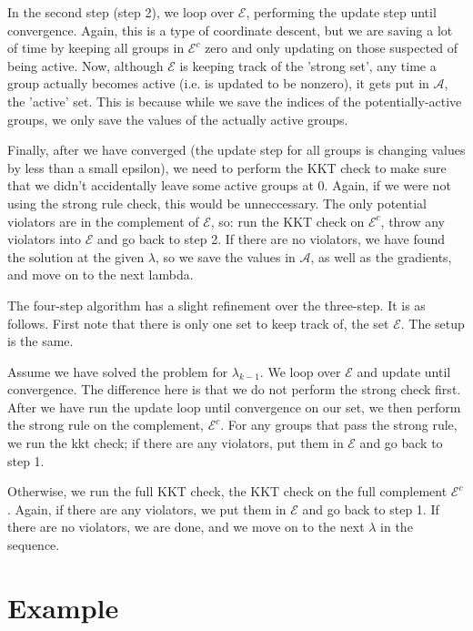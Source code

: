 \documentclass[titlepage]{article}
\begin{document}
In the second step (step 2), we loop over $\mathcal{E}$, performing the update step until convergence. Again, this is a type of coordinate descent, but we are saving a lot of time by keeping all groups in $\mathcal{E}^c$ zero and only updating on those suspected of being active. Now, although $\mathcal{E}$ is keeping track of the 'strong set', any time a group actually becomes active (i.e. is updated to be nonzero), it gets put in $\mathcal{A}$, the 'active' set. This is because while we save the indices of the potentially-active groups, we only save the values of the actually active groups.

Finally, after we have converged (the update step for all groups is changing values by less than a small epsilon), we need to perform the KKT check to make sure that we didn't accidentally leave some active groups at 0. Again, if we were not using the strong rule check, this would be unneccessary. The only potential violators are in the complement of $\mathcal{E}$, so: run the KKT check on $\mathcal{E}^c$, throw any violators into $\mathcal{E}$ and go back to step 2. If there are no violators, we have found the solution at the given $\lambda$, so we save the values in $\mathcal{A}$, as well as the gradients, and move on to the next lambda.

The four-step algorithm has a slight refinement over the three-step. It is as follows. First note that there is only one set to keep track of, the set $\mathcal{E}$. The setup is the same.

Assume we have solved the problem for $\lambda_{k-1}$. We loop over $\mathcal{E}$ and update until convergence. The difference here is that we do not perform the strong check first. After we have run the update loop until convergence on our set, we then perform the strong rule on the complement, $\mathcal{E}^c$. For any groups that pass the strong rule, we run the kkt check; if there are any violators, put them in $\mathcal{E}$ and go back to step 1. 

Otherwise, we run the full KKT check, the KKT check on the full complement $\mathcal{E}^c$. Again, if there are any violators, we put them in $\mathcal{E}$ and go back to step 1. If there are no violators, we are done, and we move on to the next $\lambda$ in the sequence.



\section{Example}
\end{document}
